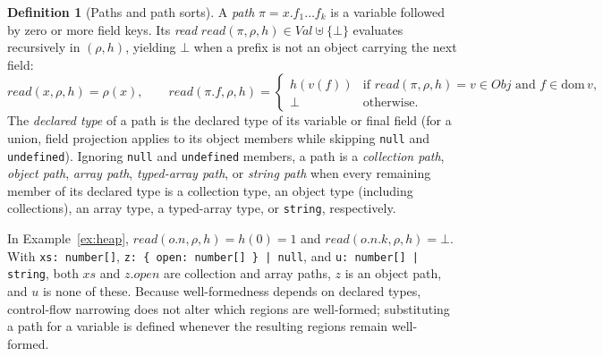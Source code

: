 \documentclass[10pt,a4paper]{article}
\theoremstyle{definition}
\newtheorem{definition}[theorem]{Definition}
\theoremstyle{remark}
\newcommand{\code}[1]{\texttt{#1}}
\begin{document}
\begin{definition}[Paths and path sorts]\label{def:paths}
A \emph{path} $\pi=x.f_1\ldots f_k$ is a variable followed by zero or
more field keys. Its \emph{read} $\mathit{read}(\pi,\rho,h)\in\mathit{Val}\uplus\{\bot\}$
evaluates recursively in $(\rho,h)$, yielding $\bot$ when a prefix is not
an object carrying the next field:
{\small\begin{displaymath}
\mathit{read}(x,\rho,h)=\rho(x),
\qquad
\mathit{read}(\pi.f,\rho,h)=\begin{cases}
  h(v(f)) & \text{if }\mathit{read}(\pi,\rho,h)=v\in\mathit{Obj}\text{ and }f\in\mathrm{dom}\,v,\\
  \bot & \text{otherwise.}
\end{cases}
\end{displaymath}}
The \emph{declared type} of a path is the declared type of its variable
or final field (for a union, field projection applies to its object
members while skipping \code{null} and \code{undefined}). Ignoring
\code{null} and \code{undefined} members, a path is a \emph{collection
path}, \emph{object path}, \emph{array path}, \emph{typed-array path}, or
\emph{string path} when every remaining member of its declared type is a
collection type, an object type (including collections), an array type, a
typed-array type, or \code{string}, respectively.
\end{definition}

\noindent
In Example~\ref{ex:heap}, $\mathit{read}(o.n,\rho,h)=h(0)=1$ and
$\mathit{read}(o.n.k,\rho,h)=\bot$. With \code{xs: number[]},
\code{z: \{ open: number[] \} | null}, and \code{u: number[] | string},
both $\mathit{xs}$ and $z.\mathit{open}$ are collection and array paths,
$z$ is an object path, and $u$ is none of these. Because well-formedness
depends on declared types, control-flow narrowing does not alter which
regions are well-formed; substituting a path for a variable is defined
whenever the resulting regions remain well-formed.
\end{document}
